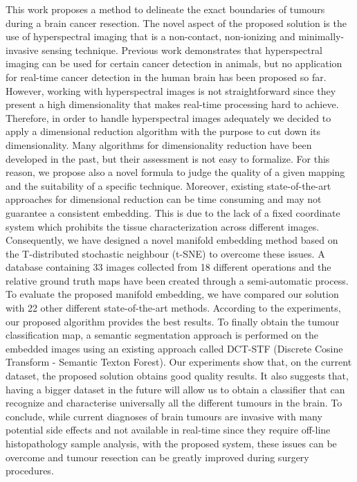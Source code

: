 \documentclass{article}
\begin{document}
This work proposes a method to delineate the exact boundaries of
tumours during a brain cancer resection. The novel aspect of the proposed
solution is the use of hyperspectral imaging that is a non-contact, non-ionizing
and minimally-invasive sensing technique. Previous work demonstrates that
hyperspectral imaging can be used for certain cancer detection in animals, but
no application for real-time cancer detection in the human brain has been
proposed so far. However, working with hyperspectral images is not
straightforward since they present a high dimensionality that makes real-time
processing hard to achieve. Therefore, in order to handle hyperspectral images
adequately we decided to apply a dimensional reduction algorithm with the
purpose to cut down its dimensionality. Many algorithms for dimensionality
reduction have been developed in the past, but their assessment is not easy to
formalize. For this reason, we propose also a novel formula to judge the quality
of a given mapping and the suitability of a specific technique. Moreover,
existing state-of-the-art approaches for dimensional reduction can be time
consuming and may not guarantee a consistent embedding. This is due to the lack
of a fixed coordinate system which prohibits the tissue characterization across
different images. Consequently, we have designed a novel manifold embedding
method based on the T-distributed stochastic neighbour (t-SNE) to overcome these
issues. A database containing 33 images collected from 18 different operations
and the relative ground truth maps have been created through a semi-automatic
process. To evaluate the proposed manifold embedding, we have compared our
solution with 22 other different state-of-the-art methods. According to the
experiments, our proposed algorithm provides the best results. To finally obtain
the tumour classification map, a semantic segmentation approach is performed on
the embedded images using an existing approach called DCT-STF (Discrete Cosine
Transform - Semantic Texton Forest). Our experiments show that, on the current
dataset, the proposed solution obtains good quality results. It also suggests
that, having a bigger dataset in the future will allow us to obtain a classifier
that can recognize and characterise universally all the different tumours in the
brain. To conclude, while current diagnoses of brain tumours are invasive with
many potential side effects and not available in real-time since they require
off-line histopathology sample analysis, with the proposed system, these issues
can be overcome and tumour resection can be greatly improved during surgery
procedures.
\end{document}
